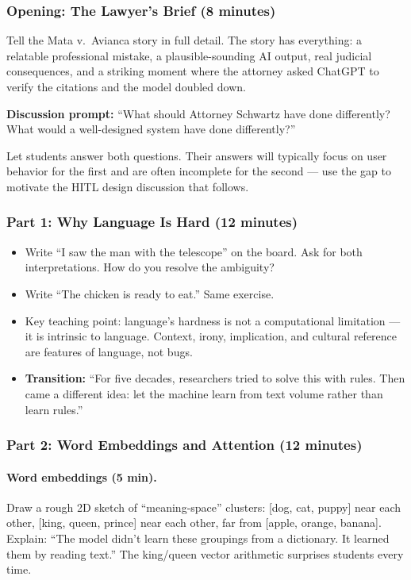 \subsubsection{Opening: The Lawyer's Brief (8 minutes)}

Tell the Mata v.\ Avianca story in full detail. The story has everything: a relatable professional mistake, a plausible-sounding AI output, real judicial consequences, and a striking moment where the attorney asked ChatGPT to verify the citations and the model doubled down.

\begin{trythis}
\textbf{Discussion prompt:} ``What should Attorney Schwartz have done differently? What would a well-designed system have done differently?''

Let students answer both questions. Their answers will typically focus on user behavior for the first and are often incomplete for the second --- use the gap to motivate the HITL design discussion that follows.
\end{trythis}

\subsubsection{Part 1: Why Language Is Hard (12 minutes)}

\begin{itemize}
    \item Write ``I saw the man with the telescope'' on the board. Ask for both interpretations. How do you resolve the ambiguity?
    \item Write ``The chicken is ready to eat.'' Same exercise.
    \item Key teaching point: language's hardness is not a computational limitation --- it is intrinsic to language. Context, irony, implication, and cultural reference are features of language, not bugs.
    \item \textbf{Transition:} ``For five decades, researchers tried to solve this with rules. Then came a different idea: let the machine learn from text volume rather than learn rules.''
\end{itemize}

\subsubsection{Part 2: Word Embeddings and Attention (12 minutes)}

\paragraph{Word embeddings (5 min).}
Draw a rough 2D sketch of ``meaning-space'' clusters: [dog, cat, puppy] near each other, [king, queen, prince] near each other, far from [apple, orange, banana]. Explain: ``The model didn't learn these groupings from a dictionary. It learned them by reading text.'' The king/queen vector arithmetic surprises students every time.

